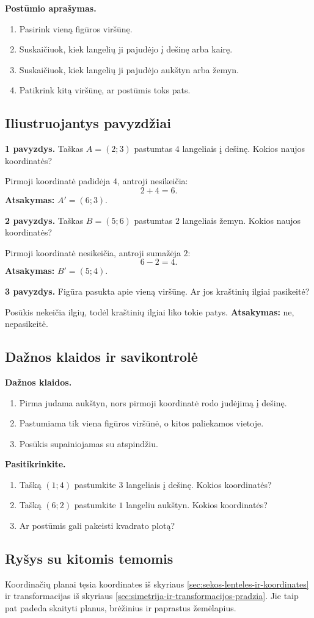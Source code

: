\textbf{Postūmio aprašymas.}
\begin{enumerate}[label=\arabic*.]
\item Pasirink vieną figūros viršūnę.
\item Suskaičiuok, kiek langelių ji pajudėjo į dešinę arba kairę.
\item Suskaičiuok, kiek langelių ji pajudėjo aukštyn arba žemyn.
\item Patikrink kitą viršūnę, ar postūmis toks pats.
\end{enumerate}

\subsection{Iliustruojantys pavyzdžiai}

\textbf{1 pavyzdys.} Taškas \(A=(2;3)\) pastumtas \(4\) langeliais į dešinę. Kokios naujos koordinatės?

Pirmoji koordinatė padidėja \(4\), antroji nesikeičia:
\[
2+4=6.
\]
\textbf{Atsakymas:} \(A'=(6;3)\).

\textbf{2 pavyzdys.} Taškas \(B=(5;6)\) pastumtas \(2\) langeliais žemyn. Kokios naujos koordinatės?

Pirmoji koordinatė nesikeičia, antroji sumažėja \(2\):
\[
6-2=4.
\]
\textbf{Atsakymas:} \(B'=(5;4)\).

\textbf{3 pavyzdys.} Figūra pasukta apie vieną viršūnę. Ar jos kraštinių ilgiai pasikeitė?

Posūkis nekeičia ilgių, todėl kraštinių ilgiai liko tokie patys.
\textbf{Atsakymas:} ne, nepasikeitė.

\subsection{Dažnos klaidos ir savikontrolė}

\textbf{Dažnos klaidos.}
\begin{enumerate}[label=\arabic*.]
\item Pirma judama aukštyn, nors pirmoji koordinatė rodo judėjimą į dešinę.
\item Pastumiama tik viena figūros viršūnė, o kitos paliekamos vietoje.
\item Posūkis supainiojamas su atspindžiu.
\end{enumerate}

\textbf{Pasitikrinkite.}
\begin{enumerate}[label=\arabic*.]
\item Tašką \((1;4)\) pastumkite \(3\) langeliais į dešinę. Kokios koordinatės?
\item Tašką \((6;2)\) pastumkite \(1\) langeliu aukštyn. Kokios koordinatės?
\item Ar postūmis gali pakeisti kvadrato plotą?
\end{enumerate}

\subsection{Ryšys su kitomis temomis}

Koordinačių planai tęsia koordinates iš skyriaus \ref{sec:sekos-lenteles-ir-koordinates} ir transformacijas iš skyriaus \ref{sec:simetrija-ir-transformacijos-pradzia}. Jie taip pat padeda skaityti planus, brėžinius ir paprastus žemėlapius.
